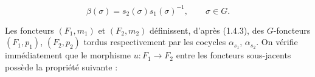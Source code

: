 \begin{equation}
  \beta(\sigma)=s_2(\sigma)s_1(\sigma)^{-1},
  \qquad \sigma\in G.
  \tag{1.4.5.3}
\end{equation}

Les foncteurs $(F_1,m_1)$ et $(F_2,m_2)$ définissent, d'après (1.4.3),
des $G$-foncteurs $(F_1,p_1)$, $(F_2,p_2)$ tordus respectivement par
les cocycles $\alpha_{s_1}$, $\alpha_{s_2}$. On vérifie immédiatement
que le morphisme $u\colon F_1\to F_2$ entre les foncteurs sous-jacents
possède la propriété suivante :

